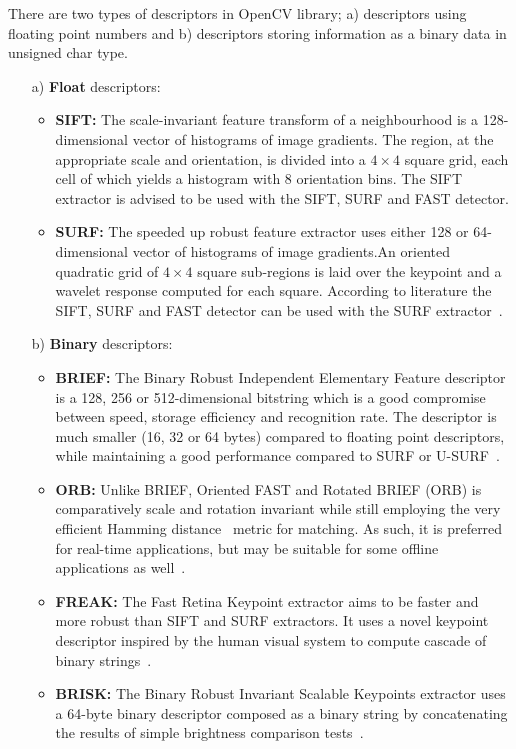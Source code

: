 There are two types of descriptors in OpenCV library; a) descriptors using floating point numbers and b) descriptors storing information as a binary data in unsigned char type.
\begin{itemize}
	\item[a)] \textbf{Float} descriptors:
	
	\begin{itemize}
		\item \textbf{SIFT:} The scale-invariant feature transform of a neighbourhood is a 128-dimensional vector of histograms of image gradients. The region, at the appropriate scale and orientation, is divided into a $4\times 4$ square grid, each cell of which yields a histogram with 8 orientation bins. The SIFT extractor is advised to be used with the SIFT, SURF and FAST detector.
		\item \textbf{SURF:} The speeded up robust feature extractor uses either 128 or 64-dimensional vector of histograms of image gradients.An oriented quadratic grid of $4 \times 4$ square sub-regions is laid over the keypoint and a wavelet response computed for each square. According to literature the SIFT, SURF and FAST detector can be used with the SURF extractor~\cite{www:sift_surf}.
	\end{itemize}
	
	\item[b)] \textbf{Binary} descriptors:
	
	\begin{itemize}
		\item \textbf{BRIEF:} The Binary Robust Independent Elementary Feature descriptor is a 128, 256 or 512-dimensional bitstring which is a good compromise between speed, storage efficiency and recognition rate. The descriptor is much smaller (16, 32 or 64 bytes) compared to floating point descriptors, while maintaining a good performance compared to SURF or U-SURF~\cite{article:brief}.
		
		\item \textbf{ORB:} Unlike BRIEF, Oriented FAST and Rotated BRIEF (ORB) is comparatively scale and rotation invariant while still employing the very efficient Hamming distance~\cite{hamming_distance} metric for matching. As such, it is preferred for real-time applications, but may be suitable for some offline applications as well~\cite{www:orb, article:orb}.
		
		\item \textbf{FREAK:} The Fast Retina Keypoint extractor aims to be faster and more robust than SIFT and SURF extractors. It uses a novel keypoint descriptor inspired by the human visual system to compute cascade of binary strings~\cite{article:freak}.
		
		\item \textbf{BRISK:}  The  Binary Robust Invariant Scalable Keypoints extractor uses a 64-byte binary descriptor composed as a binary string by concatenating the results of simple brightness comparison tests~\cite{article:brisk}.
	\end{itemize}
\end{itemize}

